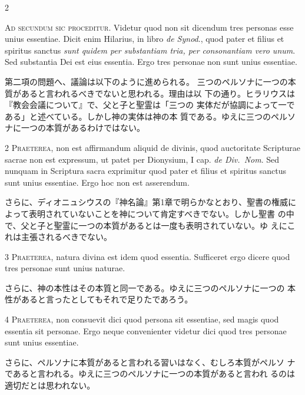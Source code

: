 \documentclass[paper=a4paper,fontsize=10pt,jafontsize=9pt,titlepage]{jlreq}
\begin{document}
\begin{paracol}{2}

{\Huge A}{\scshape d secundum sic proceditur}. Videtur quod non sit dicendum tres personas
esse unius essentiae. Dicit enim Hilarius, in libro {\itshape de Synod}., quod
pater et filius et spiritus sanctus {\itshape sunt quidem per substantiam tria,
per consonantiam vero unum}. Sed substantia Dei est eius essentia. Ergo
tres personae non sunt unius essentiae.

\switchcolumn

第二項の問題へ、議論は以下のように進められる。
三つのペルソナに一つの本質があると言われるべきでないと思われる。理由は以
 下の通り。ヒラリウスは『教会会議について』で、父と子と聖霊は「三つの
 実体だが協調によって一である」と述べている。しかし神の実体は神の本
 質である。ゆえに三つのペルソナに一つの本質があるわけではない。

\switchcolumn*

2 {\scshape Praeterea}, non est affirmandum aliquid de divinis, quod auctoritate
Scripturae sacrae non est expressum, ut patet per Dionysium, I cap. {\itshape de
Div.~Nom}. Sed nunquam in Scriptura sacra exprimitur quod pater et filius
et spiritus sanctus sunt unius essentiae. Ergo hoc non est asserendum.

\switchcolumn

さらに、ディオニュシウスの『神名論』第1章で明らかなとおり、聖書の権威に
 よって表明されていないことを神について肯定すべきでない。しかし聖書
 の中で、父と子と聖霊に一つの本質があるとは一度も表明されていない。ゆ
 えにこれは主張されるべきでない。

\switchcolumn*

3 {\scshape Praeterea}, natura divina est idem quod essentia. Sufficeret ergo dicere
quod tres personae sunt unius naturae.

\switchcolumn

さらに、神の本性はその本質と同一である。ゆえに三つのペルソナに一つの
本性があると言ったとしてもそれで足りたであろう。

\switchcolumn*

4 {\scshape Praeterea}, non consuevit dici quod persona sit essentiae, sed magis quod
essentia sit personae. Ergo neque convenienter videtur dici quod tres
personae sunt unius essentiae.

\switchcolumn

さらに、ペルソナに本質があると言われる習いはなく、むしろ本質がペルソ
 ナであると言われる。ゆえに三つのペルソナに一つの本質があると言われ
 るのは適切だとは思われない。


\end{paracol}
\end{document}
